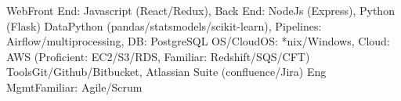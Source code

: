 \begin{additionals}
  \addional
    {Web}{Front End: Javascript (React/Redux), Back End: NodeJs (Express), Python (Flask)}
  \addional
    {Data}{Python (pandas/statsmodels/scikit-learn), Pipelines: Airflow/multiprocessing, DB: PostgreSQL}
  \addional
    {OS/Cloud}{OS: *nix/Windows, Cloud: AWS (Proficient: EC2/S3/RDS, Familiar: Redshift/SQS/CFT)}
  \addional
    {Tools}{Git/Github/Bitbucket, Atlassian Suite (confluence/Jira)}
  \addional
    {Eng Mgmt}{Familiar: Agile/Scrum}
\end{additionals}



